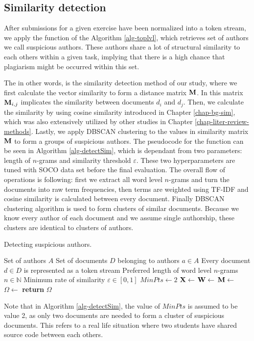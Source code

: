 \subsection{Similarity detection}


After submissions for a given exercise have been normalized into a token stream, we apply the  function of the Algorithm \ref{alg-toplvl}, which retrieves set of authors we call suspicious authors. These authors share a lot of structural similarity to each others within a given task, implying that there is a high chance that plagiarism might be occurred within this set. 

The  in other words, is the similarity detection method of our study, where we first calculate the vector similarity to form a distance matrix $\mathbf{M}$. In this matrix $\mathbf{M}_{i,j}$ implicates the similarity between documents $d_i$ and $d_j$. Then, we calculate the similarity by using cosine similarity introduced in Chapter \ref{chap-bg-sim}, which was also extensively utilized by other studies in Chapter \ref{chap-liter-review-methods}. Lastly, we apply DBSCAN clustering to the values in similarity matrix $\mathbf{M}$ to form a groups of suspicious authors. The pseudocode for the  function can be seen in Algorithm \ref{alg-detectSim}, which is dependant from two parameters: length of $n$-grams and similarity threshold $\varepsilon$. These two hyperparameters are tuned with SOCO data set before the final evaluation. The overall flow of operations is following: first we extract all word level $n$-grams and turn the documents into raw term frequencies, then terms are weighted using TF-IDF and cosine similarity is calculated between every document. Finally DBSCAN clustering algorithm is used to form clusters of similar documents. Because we know every author of each document and we assume single authorship, these clusters are identical to clusters of authors.

\clearpage

\begin{algorithm}[ht]
\caption{Detecting suspicious authors.}
\label{alg-detectSim}
\begin{algorithmic}

\Require Set of authors $A$
\Require Set of documents $D$ belonging to authors $a \in A$
\Require Every document $d \in D$ is represented as a token stream
\Require Preferred length of word level $n$-grams $n \in \mathbb{N}$
\Require Minimum rate of similarity $\varepsilon \in [0, 1]$
\Assume $MinPts \gets 2$
   \State $\mathbf{X} \gets$ 
   \State $\mathbf{W} \gets$ 
   \State $\mathbf{M} \gets$ 
   \State $\Omega \gets$ 
   \State \textbf{return} $\Omega$
\EndProcedure
\end{algorithmic}
\end{algorithm}

\noindent
Note that in Algorithm \ref{alg-detectSim}, the value of $MinPts$ is assumed to be value 2, as only two documents are needed to form a cluster of suspicious documents. This refers to a real life situation where two students have shared source code between each others. 